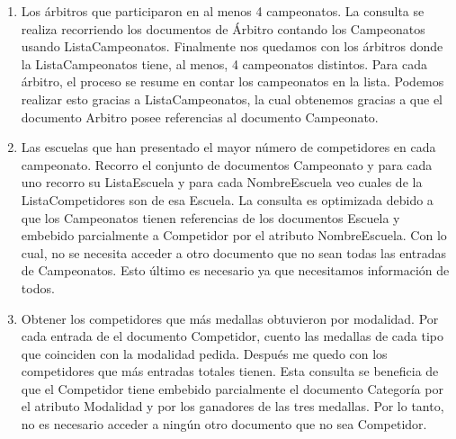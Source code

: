\begin{enumerate}
\item Los árbitros que participaron en al menos 4 campeonatos. La consulta se realiza recorriendo los documentos
de Árbitro contando los Campeonatos usando ListaCampeonatos. Finalmente nos quedamos con los árbitros donde la ListaCampeonatos
tiene, al menos, 4 campeonatos distintos. Para cada árbitro, el proceso se resume en contar los campeonatos en la lista.
Podemos realizar esto gracias a ListaCampeonatos, la cual obtenemos gracias a que el documento Arbitro posee referencias
al documento Campeonato.

\item Las escuelas que han presentado el mayor número de competidores en cada campeonato. Recorro el conjunto de documentos
Campeonato y para cada uno recorro su ListaEscuela y para cada NombreEscuela veo cuales de la ListaCompetidores son de esa
Escuela. La consulta es optimizada debido a que los Campeonatos tienen referencias de los documentos Escuela y embebido parcialmente
a Competidor por el atributo NombreEscuela. Con lo cual, no se necesita acceder a otro documento que no sean todas las
entradas de Campeonatos. Esto último es necesario ya que necesitamos información de todos.

\item Obtener los competidores que más medallas obtuvieron por modalidad. Por cada entrada de el documento Competidor,
cuento las medallas de cada tipo que coinciden con la modalidad pedida. Después me quedo con los competidores que más entradas
totales tienen. Esta consulta se beneficia de que el Competidor tiene embebido parcialmente el documento Categoría por el
atributo Modalidad y por los ganadores de las tres medallas. Por lo tanto, no es necesario acceder a ningún otro documento
que no sea Competidor.

\end{enumerate}
